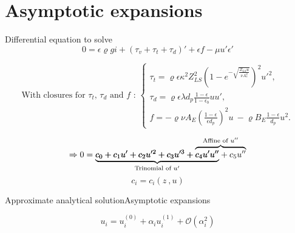 \section{Asymptotic expansions}

\begin{frame}{Differential equation to solve}
    $$0 = \epsilon \varrho g i + (\tau_v + \tau_t + \tau_d)' + \epsilon f - \mu u'\epsilon'$$

    \begin{center}
        \color{gray}
        $$\text{With closures for $\tau_t$, $\tau_d$ and $f$ : }\begin{cases}
            \tau_t = \varrho \epsilon\kappa^2 Z_{LS}^2 \left(1-e^{-\sqrt{\frac{Z_{LS}u}{\nu A_\ast^2}}}\right)^2 u'^2,\\
            \tau_d = \varrho \epsilon\lambda d_p \frac{1-\epsilon}{1-\epsilon_b} u u',\\
            f = -\varrho\nu A_E\left(\frac{1-\epsilon}{\epsilon d_p}\right)^2 u ~- \varrho B_E\frac{1-\epsilon}{d_p}u^2.
        \end{cases}$$
    \end{center}

    $$\Rightarrow 0 = \rlap{$\underbrace{c_0 + c_1 u' + c_2 u'^2 + c_3 u'^3 + c_4 u' u''}_{\text{Trinomial of }u'}$} c_0 + c_1 u' + c_2 u'^2 + c_3 u'^3 + \overbrace{c_4 u' u'' + c_5 u''}^{\text{Affine of }u''}$$
    $$c_i=c_i\left(z~,u\right)$$
\end{frame}

\begin{frame}{Approximate analytical solution}{Asymptotic expansions}

    $$u_i = u_i^{(0)} + \alpha_i u_i^{(1)} + \mathcal O(\alpha_i^2)$$

    \begin{figure}
        \centering
        
    \end{figure}
\end{frame}